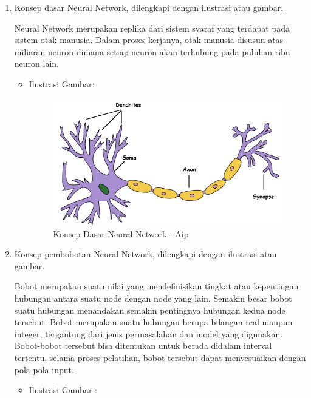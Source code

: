 \begin{enumerate}
\begin{itemize}
\end{itemize}

\item Konsep dasar Neural Network, dilengkapi dengan ilustrasi atau gambar.

Neural Network merupakan replika dari sistem syaraf yang terdapat pada sistem otak manusia. Dalam proses kerjanya, otak manusia disusun atas miliaran neuron dimana setiap neuron akan terhubung pada puluhan ribu neuron lain.
\begin{itemize}
\item Ilustrasi Gambar:

\begin{figure}[ht]
\centering
\includegraphics[scale=0.7]{figures/AIP/f2.PNG}
\caption{Konsep Dasar Neural Network - Aip}
\label{Konsep Dasar Neural Network - Aip}
\end{figure}

\end{itemize}

\item Konsep pembobotan Neural Network, dilengkapi dengan ilustrasi atau gambar.

Bobot merupakan suatu nilai yang mendefinisikan tingkat atau kepentingan hubungan antara suatu node dengan node yang lain. Semakin besar bobot suatu hubungan menandakan semakin pentingnya hubungan kedua node tersebut. Bobot merupakan suatu hubungan berupa bilangan real maupun integer, tergantung dari jenis permasalahan dan model yang digunakan. Bobot-bobot tersebut bisa ditentukan untuk berada didalam interval tertentu. selama proses pelatihan, bobot tersebut dapat menyesuaikan dengan pola-pola input.

\begin{itemize}
\item Ilustrasi Gambar :


\end{itemize}
\end{enumerate}
